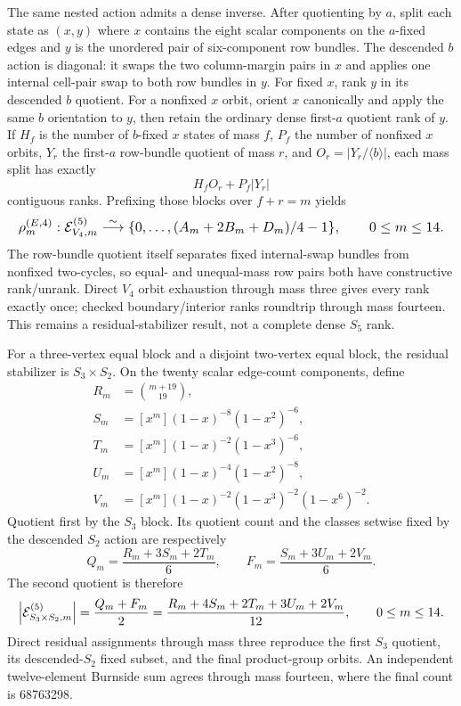 \documentclass{article}
\newcommand{\fitmath}[1]{\resizebox{0.99\linewidth}{!}{$\displaystyle #1$}}
\begin{document}
The same nested action admits a dense inverse. After quotienting by $a$, split
each state as $(x,y)$ where $x$ contains the eight scalar components on the
$a$-fixed edges and $y$ is the unordered pair of six-component row bundles.
The descended $b$ action is diagonal: it swaps the two column-margin pairs in
$x$ and applies one internal cell-pair swap to both row bundles in $y$. For
fixed $x$, rank $y$ in its descended $b$ quotient. For a nonfixed $x$ orbit,
orient $x$ canonically and apply the same $b$ orientation to $y$, then retain
the ordinary dense first-$a$ quotient rank of $y$. If $H_f$ is the number of
$b$-fixed $x$ states of mass $f$, $P_f$ the number of nonfixed $x$ orbits,
$Y_r$ the first-$a$ row-bundle quotient of mass $r$, and $O_r=|Y_r/\langle
b\rangle|$, each mass split has exactly
\[
  H_f O_r+P_f|Y_r|
\]
contiguous ranks. Prefixing those blocks over $f+r=m$ yields
\begin{equation}
  \fitmath{%
    \rho^{(E,4)}_m:
      \mathcal E^{(5)}_{V_4,m}
      \overset{\sim}{\longrightarrow}
      \{0,\ldots,(A_m+2B_m+D_m)/4-1\},
    \qquad 0\leq m\leq14.
  }
  \label{eq:optimization-crazy-preimage-cube-quintuple-v4-edge-ranking}
\end{equation}
The row-bundle quotient itself separates fixed internal-swap bundles from
nonfixed two-cycles, so equal- and unequal-mass row pairs both have constructive
rank/unrank. Direct $V_4$ orbit exhaustion through mass three gives every rank
exactly once; checked boundary/interior ranks roundtrip through mass fourteen.
This remains a residual-stabilizer result, not a complete dense $S_5$ rank.

For a three-vertex equal block and a disjoint two-vertex equal block, the
residual stabilizer is $S_3\times S_2$. On the twenty scalar edge-count
components, define
\[
  \begin{aligned}
    R_m&=\binom{m+19}{19},\\
    S_m&=[x^m](1-x)^{-8}(1-x^2)^{-6},\\
    T_m&=[x^m](1-x)^{-2}(1-x^3)^{-6},\\
    U_m&=[x^m](1-x)^{-4}(1-x^2)^{-8},\\
    V_m&=[x^m](1-x)^{-2}(1-x^3)^{-2}(1-x^6)^{-2}.
  \end{aligned}
\]
Quotient first by the $S_3$ block. Its quotient count and the classes setwise
fixed by the descended $S_2$ action are respectively
\[
  Q_m=\frac{R_m+3S_m+2T_m}{6},\qquad
  F_m=\frac{S_m+3U_m+2V_m}{6}.
\]
The second quotient is therefore
\begin{equation}
  \fitmath{%
    \left|\mathcal E^{(5)}_{S_3\times S_2,m}\right|
      =\frac{Q_m+F_m}{2}
      =\frac{R_m+4S_m+2T_m+3U_m+2V_m}{12},
    \qquad 0\leq m\leq14.
  }
  \label{eq:optimization-crazy-preimage-cube-quintuple-s3s2-edge-quotient}
\end{equation}
Direct residual assignments through mass three reproduce the first $S_3$
quotient, its descended-$S_2$ fixed subset, and the final product-group orbits.
An independent twelve-element Burnside sum agrees through mass fourteen, where
the final count is 68763298.
\end{document}
